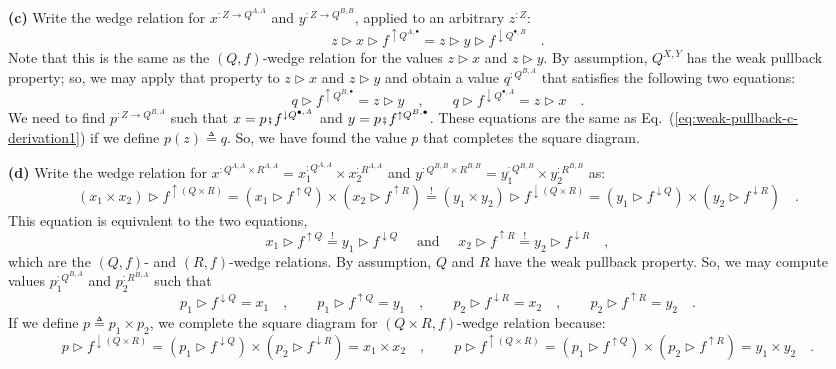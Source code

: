 \textbf{(c)} Write the wedge relation for $x^{:Z\rightarrow Q^{A,A}}$
and $y^{:Z\rightarrow Q^{B,B}}$, applied to an arbitrary $z^{:Z}$:
\[
z\triangleright x\triangleright f^{\uparrow Q^{A,\bullet}}=z\triangleright y\triangleright f^{\downarrow Q^{\bullet,B}}\quad.
\]
Note that this is the same as the $\left(Q,f\right)$-wedge relation
for the values $z\triangleright x$ and $z\triangleright y$. By assumption,
$Q^{X,Y}$ has the weak pullback property; so, we may apply that property
to $z\triangleright x$ and $z\triangleright y$ and obtain a value
$q^{:Q^{B,A}}$ that satisfies the following two equations:
\begin{equation}
q\triangleright f^{\uparrow Q^{B,\bullet}}=z\triangleright y\quad,\quad\quad q\triangleright f^{\downarrow Q^{\bullet,A}}=z\triangleright x\quad.\label{eq:weak-pullback-c-derivation1}
\end{equation}
We need to find $p^{:Z\rightarrow Q^{B,A}}$ such that $x=p\bef f^{\downarrow Q^{\bullet,A}}$
and $y=p\bef f^{\uparrow Q^{B,\bullet}}$. These equations are the
same as Eq.~(\ref{eq:weak-pullback-c-derivation1}) if we define
$p(z)\triangleq q$. So, we have found the value $p$ that completes
the square diagram.

\textbf{(d)} Write the wedge relation for $x^{:Q^{A,A}\times R^{A,A}}=x_{1}^{:Q^{A,A}}\times x_{2}^{:R^{A,A}}$
and $y^{:Q^{B,B}\times R^{B,B}}=y_{1}^{:Q^{B,B}}\times y_{2}^{:R^{B,B}}$
as:
\[
(x_{1}\times x_{2})\triangleright f^{\uparrow(Q\times R)}=(x_{1}\triangleright f^{\uparrow Q})\times(x_{2}\triangleright f^{\uparrow R})\overset{!}{=}(y_{1}\times y_{2})\triangleright f^{\downarrow(Q\times R)}=(y_{1}\triangleright f^{\downarrow Q})\times(y_{2}\triangleright f^{\downarrow R})\quad.
\]
This equation is equivalent to the two equations, 
\[
x_{1}\triangleright f^{\uparrow Q}\overset{!}{=}y_{1}\triangleright f^{\downarrow Q}\quad\text{ and }\quad x_{2}\triangleright f^{\uparrow R}\overset{!}{=}y_{2}\triangleright f^{\downarrow R}\quad,
\]
which are the $\left(Q,f\right)$- and $\left(R,f\right)$-wedge relations.
By assumption, $Q$ and $R$ have the weak pullback property. So,
we may compute values $p_{1}^{:Q^{B,A}}$ and $p_{2}^{:R^{B,A}}$
such that
\[
p_{1}\triangleright f^{\downarrow Q}=x_{1}\quad,\quad\quad p_{1}\triangleright f^{\uparrow Q}=y_{1}\quad,\quad\quad p_{2}\triangleright f^{\downarrow R}=x_{2}\quad,\quad\quad p_{2}\triangleright f^{\uparrow R}=y_{2}\quad.
\]
If we define $p\triangleq p_{1}\times p_{2}$, we complete the square
diagram for $\left(Q\times R,f\right)$-wedge relation because:
\[
p\triangleright f^{\downarrow(Q\times R)}=(p_{1}\triangleright f^{\downarrow Q})\times(p_{2}\triangleright f^{\downarrow R})=x_{1}\times x_{2}\quad,\quad\quad p\triangleright f^{\uparrow(Q\times R)}=(p_{1}\triangleright f^{\uparrow Q})\times(p_{2}\triangleright f^{\uparrow R})=y_{1}\times y_{2}\quad.
\]

